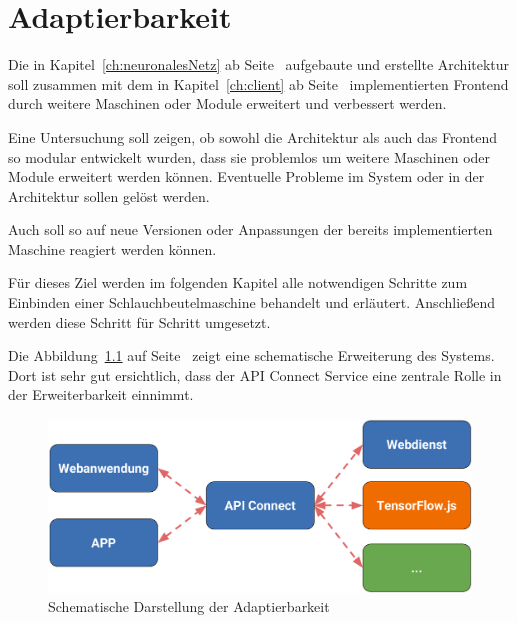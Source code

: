 \chapter{Adaptierbarkeit}
\label{ch:adaptierbarkeit}
Die in Kapitel~\ref{ch:neuronalesNetz} ab Seite~\pageref{ch:neuronalesNetz} aufgebaute und erstellte Architektur soll
zusammen mit dem in Kapitel~\ref{ch:client} ab Seite~\pageref{ch:client} implementierten Frontend durch weitere
Maschinen oder Module erweitert und verbessert werden.

Eine Untersuchung soll zeigen, ob sowohl die Architektur als auch das Frontend so modular entwickelt wurden, dass sie
problemlos um weitere Maschinen oder Module erweitert werden können. Eventuelle Probleme im System oder in der
Architektur sollen gelöst werden.

Auch soll so auf neue Versionen oder Anpassungen der bereits implementierten Maschine reagiert werden können.

Für dieses Ziel werden im folgenden Kapitel alle notwendigen Schritte zum Einbinden einer Schlauchbeutelmaschine
behandelt und erläutert. Anschließend werden diese Schritt für Schritt umgesetzt.

Die Abbildung~\ref{fig:schematische_architektur_5} auf Seite~\pageref{fig:schematische_architektur_5} zeigt eine
schematische Erweiterung des Systems. Dort ist sehr gut ersichtlich, dass der API Connect Service eine zentrale Rolle
in der Erweiterbarkeit einnimmt.

\begin{figure}[h]
    \centering
    \includegraphics[width=\textwidth]{images/kapitel_5/architektur_schematisch.pdf}
    \caption{Schematische Darstellung der Adaptierbarkeit}
    \label{fig:schematische_architektur_5}
\end{figure}
